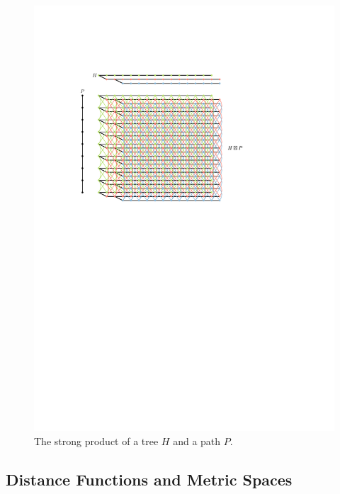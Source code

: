 \documentclass{patmorin}
\begin{document}
\begin{figure}
  \centering
  \includegraphics[page=1]{figs/product}
  \caption{The strong product of a tree $H$ and a path $P$.}
  \label{strong_product_fig}
\end{figure}


\subsection{Distance Functions and Metric Spaces}
\end{document}
